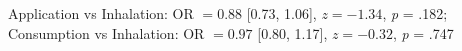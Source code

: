 Application vs Inhalation: OR $=0.88$ [0.73, 1.06], $z=-1.34$, \textit{p} = .182; Consumption vs Inhalation: OR $=0.97$ [0.80, 1.17], $z=-0.32$, \textit{p} = .747%
